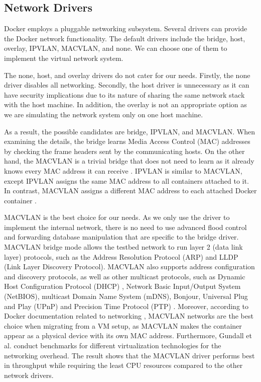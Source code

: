 \documentclass[article]{aaltoseries}
\begin{document}
\subsection{Network Drivers}
Docker employs a pluggable networking subsystem. Several drivers can provide the Docker network functionality. The default drivers include the bridge, host, overlay, IPVLAN, MACVLAN, and none. We can choose one of them to implement the virtual network system.

The none, host, and overlay drivers do not cater for our needs. Firstly, the none driver disables all networking. Secondly, the host driver is unnecessary as it can have security implications due to its nature of sharing the same network stack with the host machine. In addition, the overlay is not an appropriate option as we are simulating the network system only on one host machine.

As a result, the possible candidates are bridge, IPVLAN, and MACVLAN. When examining the details, the bridge learns Media Access Control (MAC) addresses by checking the frame headers sent by the communicating hosts. On the other hand, the MACVLAN is a trivial bridge that does not need to learn as it already knows every MAC address it can receive \cite{9620212}. IPVLAN is similar to MACVLAN, except IPVLAN assigns the same MAC address to all containers attached to it. In contrast, MACVLAN assigns a different MAC address to each attached Docker container \cite{7502883}.

MACVLAN is the best choice for our needs. As we only use the driver to implement the internal network, there is no need to use advanced flood control and forwarding database manipulation that are specific to the bridge driver. MACVLAN bridge mode allows the testbed network to run layer 2 (data link layer) protocols, such as the Address Resolution Protocol (ARP) and LLDP (Link Layer Discovery Protocol). MACVLAN also supports address configuration and discovery protocols, as well as other multicast protocols, such as Dynamic Host Configuration Protocol (DHCP) \cite{9708884}, Network Basic Input/Output System (NetBIOS), multicast Domain Name System (mDNS), Bonjour, Universal Plug and Play (UPnP) and Precision Time Protocol (PTP) \cite{9613320}. Moreover, according to Docker documentation related to networking \cite{docker_documentation_2023}, MACVLAN networks are the best choice when migrating from a VM setup, as MACVLAN makes the container appear as a physical device with its own MAC address. Furthermore, Gundall et al. \cite{9442123} conduct benchmarks for different virtualization technologies for the networking overhead. The result shows that the MACVLAN driver performs best in throughput while requiring the least CPU resources compared to the other network drivers.
\end{document}
